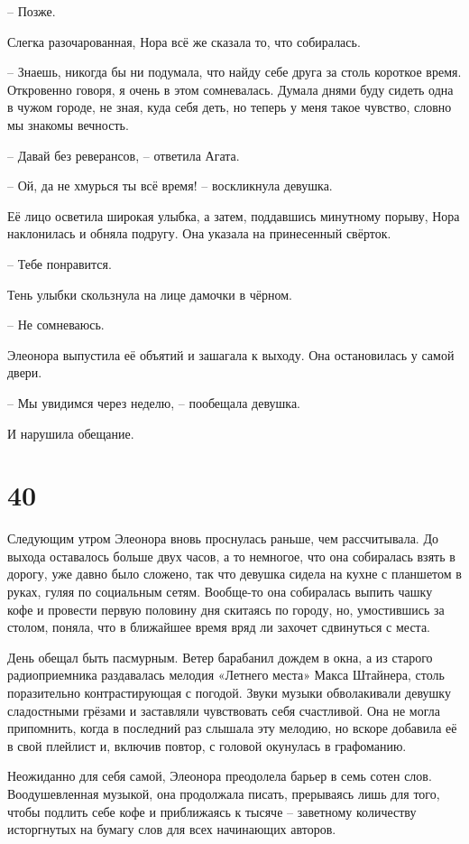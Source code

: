 \documentclass[
  a5paperpaper,
  DIV=11,
  numbers=noendperiod]{scrreprt}
\begin{document}
-- Позже.

Слегка разочарованная, Нора всё же сказала то, что собиралась.

-- Знаешь, никогда бы ни подумала, что найду себе друга за столь
короткое время. Откровенно говоря, я очень в этом сомневалась. Думала
днями буду сидеть одна в чужом городе, не зная, куда себя деть, но
теперь у меня такое чувство, словно мы знакомы вечность.

-- Давай без реверансов, -- ответила Агата.

-- Ой, да не хмурься ты всё время! -- воскликнула девушка.

Её лицо осветила широкая улыбка, а затем, поддавшись минутному порыву,
Нора наклонилась и обняла подругу. Она указала на принесенный свёрток.

-- Тебе понравится.

Тень улыбки скользнула на лице дамочки в чёрном.

-- Не сомневаюсь.

Элеонора выпустила её объятий и зашагала к выходу. Она остановилась у
самой двери.

-- Мы увидимся через неделю, -- пообещала девушка.

И нарушила обещание.

\section*{40}\label{40}


Следующим утром Элеонора вновь проснулась раньше, чем рассчитывала. До
выхода оставалось больше двух часов, а то немногое, что она собиралась
взять в дорогу, уже давно было сложено, так что девушка сидела на кухне
с планшетом в руках, гуляя по социальным сетям. Вообще-то она собиралась
выпить чашку кофе и провести первую половину дня скитаясь по городу, но,
умостившись за столом, поняла, что в ближайшее время вряд ли захочет
сдвинуться с места.

День обещал быть пасмурным. Ветер барабанил дождем в окна, а из старого
радиоприемника раздавалась мелодия «Летнего места» Макса Штайнера, столь
поразительно контрастирующая с погодой. Звуки музыки обволакивали
девушку сладостными грёзами и заставляли чувствовать себя счастливой.
Она не могла припомнить, когда в последний раз слышала эту мелодию, но
вскоре добавила её в свой плейлист и, включив повтор, с головой
окунулась в графоманию.

Неожиданно для себя самой, Элеонора преодолела барьер в семь сотен слов.
Воодушевленная музыкой, она продолжала писать, прерываясь лишь для того,
чтобы подлить себе кофе и приближаясь к тысяче -- заветному количеству
исторгнутых на бумагу слов для всех начинающих авторов.
\end{document}
